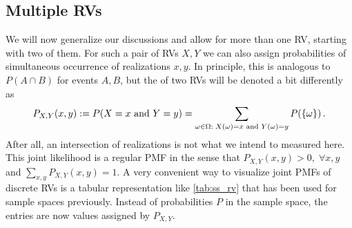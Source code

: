 	\subsection{Multiple RVs}
We will now generalize our discussions and allow for more than one RV, starting with two of them. For such a pair of RVs $X, Y$ we can also assign probabilities of simultaneous occurrence of realizations $x, y$. In principle, this is analogous to $P(A \cap B)$ for events $A, B$, but the  of two RVs will be denoted a bit differently as
\begin{equation}
P_{X, Y}(x, y) := P(X = x \text{ and } Y = y) = \sum_{\omega \in \Omega: \; X(\omega) = x \text{ and } Y(\omega) = y} P(\qty{\omega}) \, .
\end{equation}
After all, an intersection of realizations is not what we intend to measured here. This joint likelihood is a regular PMF in the sense that $P_{X, Y}(x, y) > 0, \; \forall x, y$ and $\sum_{x, y} P_{X, Y}(x, y) = 1$. A very convenient way to visualize joint PMFs of discrete RVs is a tabular representation like \ref{tab:ss_rv} that has been used for sample spaces previously. Instead of probabilities $P$ in the sample space, the entries are now values assigned by $P_{X, Y}$.



